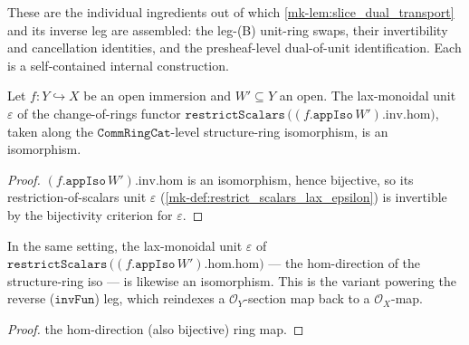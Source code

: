 These are the individual ingredients out of which \ref{mk-lem:slice_dual_transport} and its
inverse leg are assembled: the leg-(B) unit-ring swaps, their invertibility and cancellation
identities, and the presheaf-level dual-of-unit identification. Each is a self-contained
internal construction.

\begin{lemma}\label{mk-lem:isiso_eps_restrictscalars_appiso}
  \leanok

  Let \(f : Y \hookrightarrow X\) be an open immersion and \(W' \subseteq Y\) an open. The
  lax-monoidal unit \(\varepsilon\) of the change-of-rings functor
  \(\mathtt{restrictScalars}\,\bigl((f.\mathtt{appIso}\,W').\mathrm{inv}.\mathrm{hom}\bigr)\),
  taken along the \(\mathtt{CommRingCat}\)-level structure-ring isomorphism, is an
  isomorphism.
\end{lemma}
\begin{proof}
  \leanok
  \((f.\mathtt{appIso}\,W').\mathrm{inv}.\mathrm{hom}\) is an isomorphism, hence bijective, so
  its restriction-of-scalars unit \(\varepsilon\) (\ref{mk-def:restrict_scalars_lax_epsilon}) is
  invertible by the bijectivity criterion for \(\varepsilon\).
\end{proof}

\begin{lemma}\label{mk-lem:isiso_eps_restrictscalars_appiso_hom}
  \leanok

  In the same setting, the lax-monoidal unit \(\varepsilon\) of
  \(\mathtt{restrictScalars}\,\bigl((f.\mathtt{appIso}\,W').\mathrm{hom}.\mathrm{hom}\bigr)\)
  --- the \(\mathrm{hom}\)-direction of the structure-ring iso --- is likewise an
  isomorphism. This is the variant powering the reverse (\(\mathtt{invFun}\)) leg, which
  reindexes a \(\mathcal{O}_Y\)-section map back to a \(\mathcal{O}_X\)-map.
\end{lemma}
\begin{proof}
  \leanok
  the \(\mathrm{hom}\)-direction (also bijective) ring map.
\end{proof}

